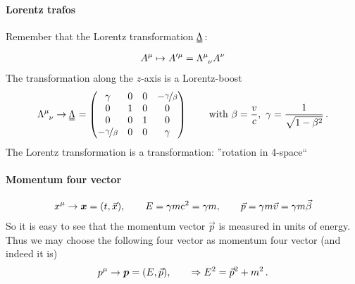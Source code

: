 \paragraph{Lorentz trafos}
Remember that the Lorentz transformation $\uul \Lambda$:
\begin{align}
    A^\mu \mapsto A'^\mu = \tensor{\Lambda}{^\mu_\nu}A^\nu
\end{align}
The transformation along the $z$-axis  is a Lorentz-boost
\begin{align}
    \tensor{\Lambda}{^\mu_\nu} \ra \uul \Lambda = \mqty(\gamma & 0 &  0 &- \nicefrac \gamma \beta \\ 0 & 1 & 0 & 0 \\ 0 & 0 & 1 & 0 \\ - \nicefrac \gamma \beta & 0 & 0 & \gamma) \qquad \text{ with } \beta = \frac vc, \ \gamma = \frac{1}{\sqrt{1-\beta^2}}\,.
\end{align}
The Lorentz transformation is a  transformation: ''rotation in 4-space``
\paragraph{Momentum four vector}
\begin{align}
    x^\mu \rightarrow {\bm{x}} = \qty( t, \vec x), \qquad E = \gamma m \mathrm{c}^2 = \gamma m, \qquad \vec p = \gamma m \vec v = \gamma m \vec \beta
\end{align}
So it is easy to see that the momentum vector $\vec p$ is measured in units of energy. Thus we may choose the following four vector as momentum four vector (and indeed it is)
\begin{align}
    p^\mu \rightarrow {\bm{p}} = \qty( E, \vec p ), \qquad \Rightarrow E^2 = \vec p^2 +m^2\,.
\end{align}
